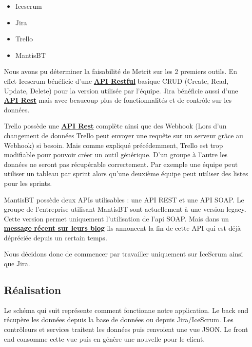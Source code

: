 \documentclass[12pt, twoside, openright]{report}
\begin{document}
\begin{itemize}
\item Icescrum
\item Jira  
\item Trello 
\item MantisBT
\end{itemize}

Nous avons pu déterminer la faisabilité de Metrit sur les 2 premiers outils. En effet Icescrum bénéficie d'une \href{https://www.icescrum.com/documentation/rest-api/}{\textbf{API Restful}} basique CRUD (Create, Read, Update, Delete) pour la version utilisée par l'équipe. Jira bénéficie aussi d'une \href{https://developer.atlassian.com/cloud/jira/platform/rest/}{\textbf{API Rest}} mais avec beaucoup plus de fonctionnalités et de contrôle sur les données.

Trello possède une \href{https://trello.readme.io/docs/api-introduction}{\textbf{API Rest}} complète ainsi que des Webhook (Lors d'un changement de données Trello peut envoyer une requête sur un serveur grâce au Webhook) si besoin. Mais comme expliqué précédemment, Trello est trop modifiable pour pouvoir créer un outil générique. D'un groupe à l'autre les données ne seront pas récupérable correctement. Par exemple une équipe peut utiliser un tableau par sprint alors qu'une deuxième équipe peut utiliser des listes pour les sprints.

MantisBT possède deux APIs utilisables : une API REST et une API SOAP. Le groupe de l'entreprise utilisant MantisBT sont actuellement à une version legacy. Cette version permet uniquement l'utilisation de l'api SOAP. Mais dans un \href{https://support.mantishub.com/hc/en-us/articles/203574999-MantisHub-SOAP-API}{\textbf{message récent sur leurs blog}} ils annoncent la fin de cette API qui est déjà dépréciée depuis un certain temps.

Nous décidons donc de commencer par travailler uniquement sur IceScrum ainsi que Jira.

\subsection{Réalisation}

Le schéma qui suit représente comment fonctionne notre application. Le back end récupère les données depuis la base de données ou depuis Jira/IceScrum. Les contrôleurs et services traitent les données puis renvoient une vue JSON. Le front end consomme cette vue puis en génère une nouvelle pour le client. 
\end{document}
